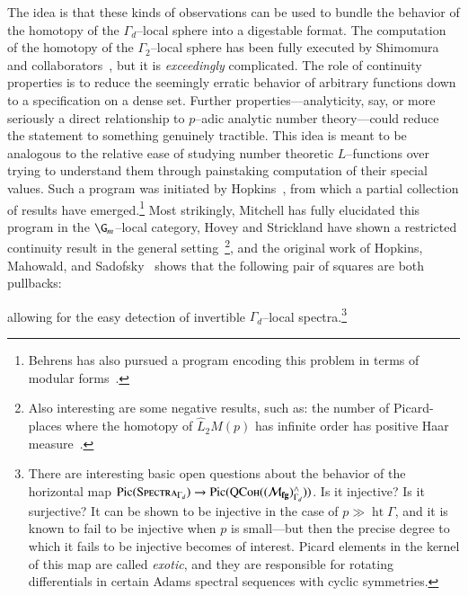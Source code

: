 The idea is that these kinds of observations can be used to bundle the behavior of the homotopy of the $\Gamma_d$--local sphere into a digestable format.  The computation of the homotopy of the $\Gamma_2$--local sphere has been fully executed by Shimomura and collaborators~\cite{Shimomura,ShimomuraYabeM20,ShimomuraYabeL2S,BehrensRevisited}, but it is \emph{exceedingly} complicated.  The role of continuity properties is to reduce the seemingly erratic behavior of arbitrary functions down to a specification on a dense set.  Further properties---analyticity, say, or more seriously a direct relationship to $p$--adic analytic number theory---could reduce the statement to something genuinely tractible.  This idea is meant to be analogous to the relative ease of studying number theoretic $L$--functions over trying to understand them through painstaking computation of their special values.  Such a program was initiated by Hopkins~\cite{StricklandpAdicInterpolation}, from which a partial collection of results have emerged.\footnote{Behrens has also pursued a program encoding this problem in terms of modular forms~\cite{BehrensCongruences,BehrensModularDescription,BehrensBuildings}.}  Most strikingly, Mitchell \cite{MitchellIwasawa,HahnMitchell} has fully elucidated this program in the $\G_m$--local category, Hovey and Strickland have shown a restricted continuity result in the general setting~\cite[Section 14]{HoveyStrickland}\footnote{Also interesting are some negative results, such as: the number of Picard-places where the homotopy of $\widehat L_2 M(p)$ has infinite order has positive Haar measure~\cite[Section 15.2]{HoveyStrickland}.}, and the original work of Hopkins, Mahowald, and Sadofsky~\cite{HMS} shows that the following pair of squares are both pullbacks:
\begin{center}
\end{center}
allowing for the easy detection of invertible $\Gamma_d$--local spectra.\footnote{There are interesting basic open questions about the behavior of the horizontal map $\operatorname{Pic}(\normalfont\textsc{Spectra}_{\Gamma_d}) \to \operatorname{Pic}(\normalfont\textsc{QCoh}((\mathcal{M}_{\mathbf{fg}})^\wedge_{\Gamma_d}))$.  Is it injective?  Is it surjective?  It can be shown to be injective in the case of $p \gg \operatorname{ht} \Gamma$, and it is known to fail to be injective when $p$ is small---but then the precise degree to which it fails to be injective becomes of interest.  Picard elements in the kernel of this map are called \textit{exotic}, and they are responsible for rotating differentials in certain Adams spectral sequences with cyclic symmetries.}

